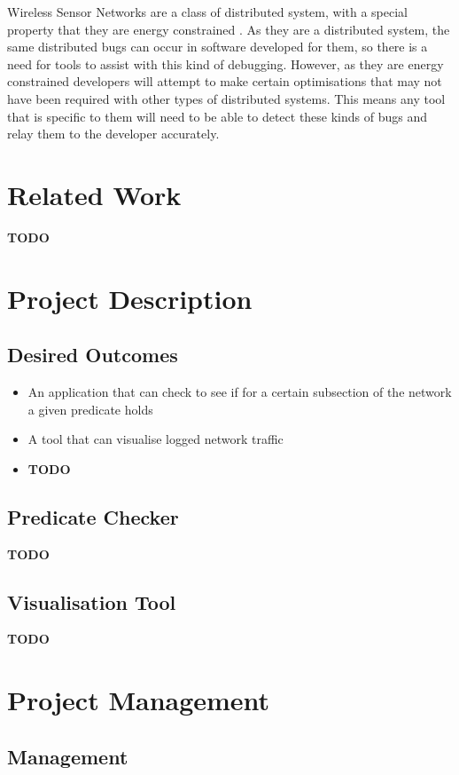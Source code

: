 \documentclass[a4paper]{article}
\begin{document}
Wireless Sensor Networks are a class of distributed system, with a special property that they are energy constrained \cite{6023235}.  As they are a distributed system, the same distributed bugs can occur in software developed for them, so there is a need for tools to assist with this kind of debugging. However, as they are energy constrained developers will attempt to make certain optimisations that may not have been required with other types of distributed systems. This means any tool that is specific to them will need to be able to detect these kinds of bugs and relay them to the developer accurately.

\section{Related Work}

\textbf{TODO}

\clearpage

\section{Project Description}

\subsection{Desired Outcomes}
\begin{itemize}
	\item An application that can check to see if for a certain subsection of the network a given predicate holds
	\item A tool that can visualise logged network traffic
	\item \textbf{TODO}
\end{itemize}

\subsection{Predicate Checker}
\textbf{TODO}

\subsection{Visualisation Tool}
\textbf{TODO}

\section{Project Management}

\subsection{Management}
\end{document}

